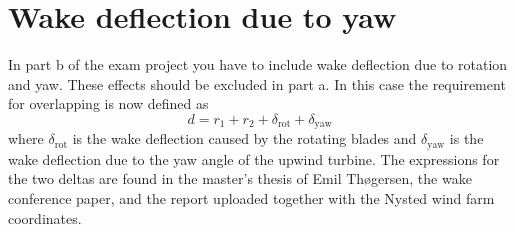 \documentclass[a4paper, 11pt]{article}
\begin{document}
\section{Wake deflection due to yaw}
In part b of the exam project you have to include wake deflection due to rotation and yaw. These effects should be excluded in part a. In this case the requirement for overlapping is now defined as
\begin{equation}
d = r_1+r_2+\delta_\text{rot}+\delta_\text{yaw}
\end{equation}
where $\delta_\text{rot}$ is the wake deflection caused by the rotating blades and $\delta_\text{yaw}$ is the wake deflection due to the yaw angle of the upwind turbine. The expressions for the two deltas are found in the master's thesis of Emil Thøgersen, the wake conference paper, and the report uploaded together with the Nysted wind farm coordinates. 
\end{document}
